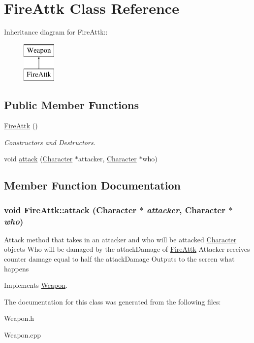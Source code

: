 \hypertarget{classFireAttk}{
\section{FireAttk Class Reference}
\label{classFireAttk}
}
Inheritance diagram for FireAttk::\begin{figure}[H]
\begin{center}
\leavevmode
\includegraphics[height=2cm]{classFireAttk}
\end{center}
\end{figure}
\subsection*{Public Member Functions}
\begin{DoxyCompactItemize}
\item 
\hypertarget{classFireAttk_abec5fb6b60d210f2633ba0ac0ecea017}{
\hyperlink{classFireAttk_abec5fb6b60d210f2633ba0ac0ecea017}{FireAttk} ()}
\label{classFireAttk_abec5fb6b60d210f2633ba0ac0ecea017}

\begin{DoxyCompactList}\small\item\em Constructors and Destructors. \item\end{DoxyCompactList}\item 
void \hyperlink{classFireAttk_a0a6f02e6cb56e5ceabde1fff79be7dd4}{attack} (\hyperlink{classCharacter}{Character} $\ast$attacker, \hyperlink{classCharacter}{Character} $\ast$who)
\end{DoxyCompactItemize}


\subsection{Member Function Documentation}
\hypertarget{classFireAttk_a0a6f02e6cb56e5ceabde1fff79be7dd4}{
\subsubsection[{attack}]{\setlength{\rightskip}{0pt plus 5cm}void FireAttk::attack ({\bf Character} $\ast$ {\em attacker}, \/  {\bf Character} $\ast$ {\em who})}}
\label{classFireAttk_a0a6f02e6cb56e5ceabde1fff79be7dd4}
Attack method that takes in an attacker and who will be attacked \hyperlink{classCharacter}{Character} objects Who will be damaged by the attackDamage of \hyperlink{classFireAttk}{FireAttk} Attacker receives counter damage equal to half the attackDamage Outputs to the screen what happens 

Implements \hyperlink{classWeapon_a74d99dd40d8872718710bcf94fff98d7}{Weapon}.

The documentation for this class was generated from the following files:\begin{DoxyCompactItemize}
\item 
Weapon.h\item 
Weapon.cpp\end{DoxyCompactItemize}
